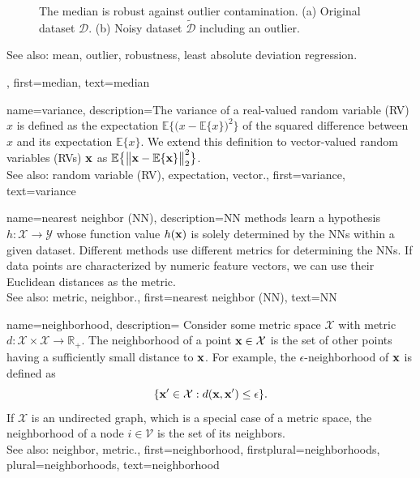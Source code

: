 {{{\begin{figure}[H]
		\caption{The median is robust against outlier contamination. (a) Original dataset $\mathcal{D}$. (b) Noisy 
		dataset $\widetilde{\mathcal{D}}$ including an outlier. \label{fig_median2_dict}}
		\end{figure}
		See also: mean, outlier, robustness, least absolute deviation regression.}, 
	first={median}, 
	text={median} 
}

{name={variance},
	description={The variance of a real-valued random variable (RV) $x$ is defined as the expectation 
		$\mathbb{E} \big\{ \big( x - \mathbb{E} \{x \} \big)^{2} \big\}$ of the squared difference between $x$ 
		and its expectation $\mathbb{E} \{x \}$. We extend this definition to vector-valued random variables (RVs) ${\bf x}$ 
		as $\mathbb{E} \big\{ \big\| {\bf x} - \mathbb{E} \{{\bf x} \} \big\|_{2}^{2} \big\}$.
					\\ 
		See also: random variable (RV), expectation, vector.},
	first={variance},
	text={variance} 
}

{name={nearest neighbor (NN)},
	description={NN methods learn a hypothesis 
		$h: \mathcal{X} \rightarrow \mathcal{Y}$ whose function value $h({\bf x})$ 
		is solely determined by the NNs within a given dataset. Different 
		methods use different metrics for determining the NNs. If data points 
		are characterized by numeric feature vectors, we can use their Euclidean distances as 
		the metric.
					\\ 
		See also: metric, neighbor.},
	first={nearest neighbor (NN)},
	text={NN} 
}

 {name={neighborhood},
 	description={
 	Consider some metric space $\mathcal{X}$ with metric 
	$d: \mathcal{X} \times \mathcal{X} \rightarrow \mathbb{R}_{+}$.	
 	The neighborhood of a point ${\bf x} \in \mathcal{X}$ 
 	is the set of other points having a sufficiently small distance to ${\bf x}$. 
 	For example, the $\epsilon$-neighborhood of ${\bf x}$ is defined as
 	$$ \{ {\bf x}' \in \mathcal{X} : d({\bf x}, {\bf x}') \leq \epsilon \}.$$
	If $\mathcal{X}$ is an undirected graph, which is a special case of 
 	a metric space, the neighborhood of a node $i \in \mathcal{V}$ 
 	is the set of its neighbors.
 				\\ 
 	See also: neighbor, metric.},
 	first={neighborhood},
	firstplural={neighborhoods},
 	plural={neighborhoods},
 	text={neighborhood} 
 }


}
